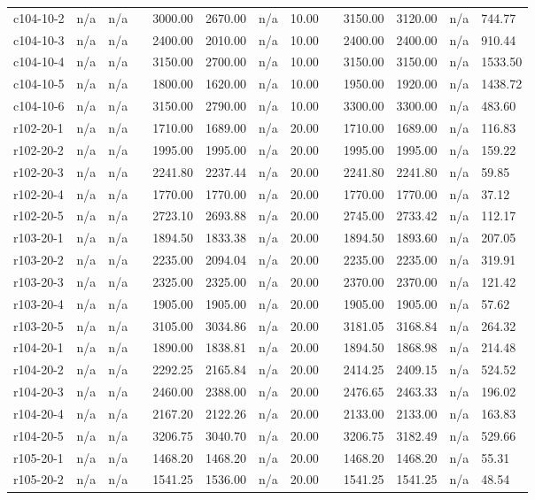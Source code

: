 \documentclass[final,5p,times,twocolumn]{elsarticle}
\begin{document}
{{{{{{{{{{{{{\begin{longtable}{l l l l l l l l l l l l l}
c104-10-2& n/a& n/a&&3000.00& 2670.00& n/a& 10.00&&3150.00& 3120.00& n/a& 744.77\\
c104-10-3& n/a& n/a&&2400.00& 2010.00& n/a& 10.00&&2400.00& 2400.00& n/a& 910.44\\
c104-10-4& n/a& n/a&&3150.00& 2700.00& n/a& 10.00&&3150.00& 3150.00& n/a& 1533.50\\
c104-10-5& n/a& n/a&&1800.00& 1620.00& n/a& 10.00&&1950.00& 1920.00& n/a& 1438.72\\
c104-10-6& n/a& n/a&&3150.00& 2790.00& n/a& 10.00&&3300.00& 3300.00& n/a& 483.60\\
r102-20-1& n/a& n/a&&1710.00& 1689.00& n/a& 20.00&&1710.00& 1689.00& n/a& 116.83\\
r102-20-2& n/a& n/a&&1995.00& 1995.00& n/a& 20.00&&1995.00& 1995.00& n/a& 159.22\\
r102-20-3& n/a& n/a&&2241.80& 2237.44& n/a& 20.00&&2241.80& 2241.80& n/a& 59.85\\
r102-20-4& n/a& n/a&&1770.00& 1770.00& n/a& 20.00&&1770.00& 1770.00& n/a& 37.12\\
r102-20-5& n/a& n/a&&2723.10& 2693.88& n/a& 20.00&&2745.00& 2733.42& n/a& 112.17\\
r103-20-1& n/a& n/a&&1894.50& 1833.38& n/a& 20.00&&1894.50& 1893.60& n/a& 207.05\\
r103-20-2& n/a& n/a&&2235.00& 2094.04& n/a& 20.00&&2235.00& 2235.00& n/a& 319.91\\
r103-20-3& n/a& n/a&&2325.00& 2325.00& n/a& 20.00&&2370.00& 2370.00& n/a& 121.42\\
r103-20-4& n/a& n/a&&1905.00& 1905.00& n/a& 20.00&&1905.00& 1905.00& n/a& 57.62\\
r103-20-5& n/a& n/a&&3105.00& 3034.86& n/a& 20.00&&3181.05& 3168.84& n/a& 264.32\\
r104-20-1& n/a& n/a&&1890.00& 1838.81& n/a& 20.00&&1894.50& 1868.98& n/a& 214.48\\
r104-20-2& n/a& n/a&&2292.25& 2165.84& n/a& 20.00&&2414.25& 2409.15& n/a& 524.52\\
r104-20-3& n/a& n/a&&2460.00& 2388.00& n/a& 20.00&&2476.65& 2463.33& n/a& 196.02\\
r104-20-4& n/a& n/a&&2167.20& 2122.26& n/a& 20.00&&2133.00& 2133.00& n/a& 163.83\\
r104-20-5& n/a& n/a&&3206.75& 3040.70& n/a& 20.00&&3206.75& 3182.49& n/a& 529.66\\
r105-20-1& n/a& n/a&&1468.20& 1468.20& n/a& 20.00&&1468.20& 1468.20& n/a& 55.31\\
r105-20-2& n/a& n/a&&1541.25& 1536.00& n/a& 20.00&&1541.25& 1541.25& n/a& 48.54\\

\end{longtable}}}}}}}}}}}}}}
\end{document}
